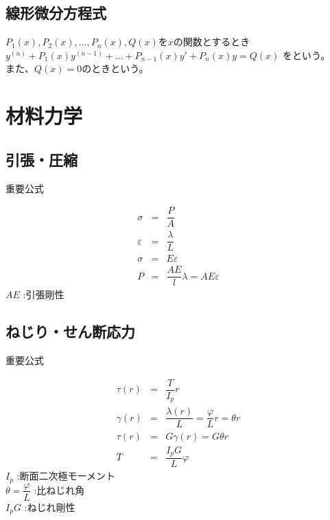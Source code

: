 \documentclass[a4paper]{jsarticle}
\begin{document}
\subsection{線形微分方程式}
$P_1\left(x\right),P_2\left(x\right),\dots,P_n\left(x\right),Q\left(x\right)$を$x$の関数とするとき\\
$y^{\left(n\right)}+P_1\left(x\right)y^{\left(n-1\right)}+\dots+P_{n-1}\left(x\right)y'+P_n\left(x\right)y=Q\left(x\right)$
をという。\\
また、$Q\left(x\right)=0$のときという。
\newpage
\section{材料力学}
\subsection{引張・圧縮}
\begin{itembox}[l]{重要公式}
    \begin{center}
        \begin{eqnarray*}
            \sigma&=&\dfrac{P}{A}\\
            \varepsilon&=&\dfrac{\lambda}{L}\\
            \sigma&=&E\varepsilon\\
            P&=&\dfrac{AE}{l}\lambda=AE\varepsilon
        \end{eqnarray*}
        $AE$  :引張剛性
    \end{center}
\end{itembox}
\subsection{ねじり・せん断応力}
\begin{itembox}[l]{重要公式}
    \begin{center}
        \begin{eqnarray*}
            \tau\left(r\right)&=&\dfrac{T}{I_p} r\\
            \gamma\left(r\right)&=&\dfrac{\lambda\left(r\right)}{L}=\dfrac{\varphi}{L}r=\theta r\\
            \tau\left(r\right)&=&G\gamma\left(r\right)=G\theta r\\
            T&=&\dfrac{I_pG}{L}\varphi
        \end{eqnarray*}
        $I_p$ :断面二次極モーメント\\
        $\theta=\dfrac{\varphi}{L}$ :比ねじれ角\\
        $I_pG$  :ねじれ剛性
    \end{center}
\end{itembox}
\end{document}
